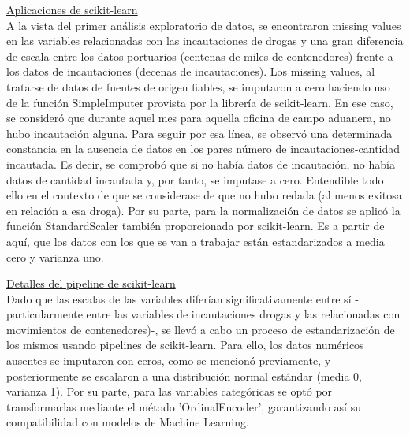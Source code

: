 \documentclass[12pt]{article}
\begin{document}
		\underline{Aplicaciones de scikit-learn}\\
		A la vista del primer análisis exploratorio de datos, se encontraron missing values en las variables relacionadas con las incautaciones de drogas y una gran diferencia de escala entre los datos portuarios (centenas de miles de contenedores) frente a los datos de incautaciones (decenas de incautaciones). Los missing values, al tratarse de datos de fuentes de origen fiables, se imputaron a cero haciendo uso de la función SimpleImputer provista por la librería de scikit-learn. En ese caso, se consideró que durante aquel mes para aquella oficina de campo aduanera, no hubo incautación alguna. Para seguir por esa línea, se observó una determinada constancia en la ausencia de datos en los pares número de incautaciones-cantidad incautada. Es decir, se comprobó que si no había datos de incautación, no había datos de cantidad incautada y, por tanto, se imputase a cero. Entendible todo ello en el contexto de que se considerase de que no hubo redada (al menos exitosa en relación a esa droga). Por su parte, para la normalización de datos se aplicó la función StandardScaler también proporcionada por scikit-learn. Es a partir de aquí, que los datos con los que se van a trabajar están estandarizados a media cero y varianza uno.
		
		\underline{Detalles del pipeline de scikit-learn}\\
		Dado que las escalas de las variables diferían significativamente entre sí -particularmente entre las variables de incautaciones drogas y las relacionadas con movimientos de contenedores)-, se llevó a cabo un proceso de estandarización de los mismos usando pipelines de scikit-learn.
		Para ello, los datos numéricos ausentes se imputaron con ceros, como se mencionó previamente, y posteriormente se escalaron a una distribución normal estándar (media 0, varianza 1). Por su parte, para las variables categóricas se optó por transformarlas mediante el método 'OrdinalEncoder', garantizando así su compatibilidad con modelos de Machine Learning.
		
\end{document}
